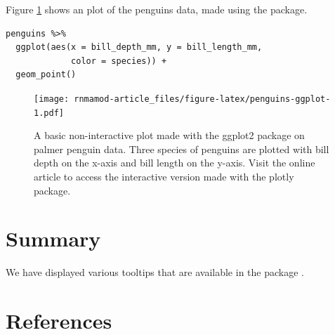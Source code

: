 Figure \ref{fig:penguins-ggplot} shows an plot of the penguins data, made using the  package.

\begin{verbatim}
penguins %>% 
  ggplot(aes(x = bill_depth_mm, y = bill_length_mm, 
             color = species)) + 
  geom_point()
\end{verbatim}

\begin{figure}
\centering
\texttt{[image: rnmamod-article\_files/figure-latex/penguins-ggplot-1.pdf]}
\caption{\label{fig:penguins-ggplot}A basic non-interactive plot made with the ggplot2 package on palmer penguin data. Three species of penguins are plotted with bill depth on the x-axis and bill length on the y-axis. Visit the online article to access the interactive version made with the plotly package.}
\end{figure}

\hypertarget{summary}{%
\section{Summary}\label{summary}}

We have displayed various tooltips that are available in the package .

\hypertarget{references}{%
\section*{References}\label{references}}

